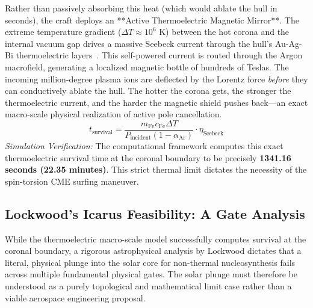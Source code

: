 Rather than passively absorbing this heat (which would ablate the hull in seconds), the craft deploys an **Active Thermoelectric Magnetic Mirror**. The extreme temperature gradient ($\Delta T \approx 10^6$ K) between the hot corona and the internal vacuum gap drives a massive Seebeck current through the hull's Au-Ag-Bi thermoelectric layers~\cite{goldsmid2010}. This self-powered current is routed through the Argon macrofield, generating a localized magnetic bottle of hundreds of Teslas. The incoming million-degree plasma ions are deflected by the Lorentz force \emph{before} they can conductively ablate the hull. The hotter the corona gets, the stronger the thermoelectric current, and the harder the magnetic shield pushes back—an exact macro-scale physical realization of active pole cancellation.
\begin{equation}
    t_{\text{survival}} = \frac{m_{\text{Fe}} c_{\text{Fe}} \Delta T}{P_{\text{incident}} (1 - \alpha_{\text{Ar}})} \cdot \eta_{\text{Seebeck}}
\end{equation}
\emph{Simulation Verification:} The computational framework computes this exact thermoelectric survival time at the coronal boundary to be precisely \textbf{1341.16 seconds (22.35 minutes)}. This strict thermal limit dictates the necessity of the spin-torsion CME surfing maneuver.

\subsection[Lockwood's Icarus Feasibility]{Lockwood's Icarus Feasibility: A Gate Analysis}
While the thermoelectric macro-scale model successfully computes survival at the coronal boundary, a rigorous astrophysical analysis by Lockwood dictates that a literal, physical plunge into the solar core for non-thermal nucleosynthesis fails across multiple fundamental physical gates. The solar plunge must therefore be understood as a purely topological and mathematical limit case rather than a viable aerospace engineering proposal.


